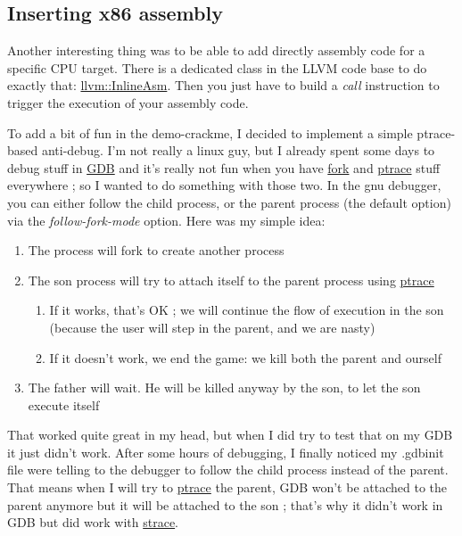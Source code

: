 \documentclass[a4paper, 11pt, notitlepage]{report}
\begin{document}
\subsection{Inserting x86 assembly}
Another interesting thing was to be able to add directly assembly code for a specific CPU target. There is a dedicated class in the LLVM code base to do exactly that: \href{https://llvm.org/viewvc/llvm-project/llvm/trunk/include/llvm/IR/InlineAsm.h?view=markup}{llvm::InlineAsm}. Then you just have to build a \textit{call} instruction to trigger the execution of your assembly code.
To add a bit of fun in the demo-crackme, I decided to implement a simple ptrace-based anti-debug. I'm not really a linux guy, but I already spent some days to debug stuff in \href{http://www.gnu.org/software/gdb/}{GDB} and it's really not fun when you have \href{http://linux.die.net/man/2/fork}{fork} and \href{http://linux.die.net/man/2/ptrace}{ptrace} stuff everywhere ; so I wanted to do something with those two. In the gnu debugger, you can either follow the child process, or the parent process (the default option) via the \textit{follow-fork-mode} option. Here was my simple idea:
\begin{enumerate}
	\item The process will fork to create another process
	\item The son process will try to attach itself to the parent process using \href{http://linux.die.net/man/2/ptrace}{ptrace}
	\begin{enumerate}
		\item If it works, that's OK ; we will continue the flow of execution in the son (because the user will step in the parent, and we are nasty)
		\item If it doesn't work, we end the game: we kill both the parent and ourself
	\end{enumerate}
	\item The father will wait. He will be killed anyway by the son, to let the son execute itself
\end{enumerate}
That worked quite great in my head, but when I did try to test that on my GDB it just didn't work. After some hours of debugging, I finally noticed my .gdbinit file were telling to the debugger to follow the child process instead of the parent. That means when I will try to \href{http://linux.die.net/man/2/ptrace}{ptrace} the parent, GDB won't be attached to the parent anymore but it will be attached to the son ; that's why it didn't work in GDB but did work with \href{http://linux.die.net/man/1/strace}{strace}.
\end{document}
